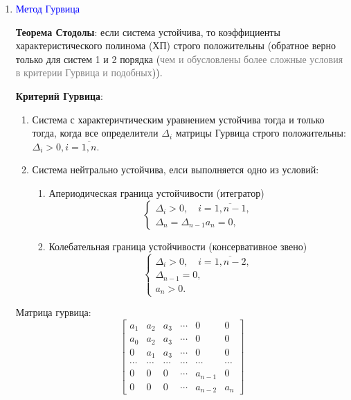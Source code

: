 \begin{enumerate}
    \item \textcolor{blue}{Метод Гурвица}
    
    \textbf{Теорема Стодолы}: если система устойчива, то коэффициенты характеристического полинома (ХП) строго положительны (обратное верно только для систем 1 и 2 порядка (\textcolor{gray}{чем и обусловлены более сложные условия в критерии Гурвица и подобных})).
    
    \textbf{Критерий Гурвица}:
    \begin{enumerate}
        \item Система с характеричтическим уравнением устойчива тогда и только тогда, когда все определители $\Delta_i$ матрицы Гурвица строго положительны: $\Delta_i > 0, i=\overline{1,n}$.
        \item Система нейтрально устойчива, елси выполняется одно из условий:
        \begin{enumerate}
            \item Апериодическая граница устойчивости (итегратор)
            \begin{equation}
                \begin{cases}
                    \Delta_i > 0, \quad i=\overline{1, n-1}, \\
                    \Delta_n = \Delta_{n-1} a_n = 0,
                \end{cases}
            \end{equation}
            \item Колебательная граница устойчивости (консервативное звено)
            \begin{equation}
                \begin{cases}
                    \Delta_i > 0, \quad i=\overline{1, n-2}, \\
                    \Delta_{n-1} = 0, \\
                    a_n > 0.
                \end{cases}
            \end{equation}
        \end{enumerate}
    \end{enumerate}
    
    Матрица гурвица:
    \begin{equation}
        \begin{bmatrix}
            a_1 & a_2 & a_3 &\cdots & 0 & 0 \\
            a_0 & a_2 & a_3 &\cdots & 0 & 0 \\
            0 & a_1 & a_3 &\cdots & 0 & 0 \\
            \cdots & \cdots & \cdots & \cdots & \cdots & \cdots \\
            0 & 0 & 0 &\cdots & a_{n-1} & 0 \\
            0 & 0 & 0 &\cdots & a_{n-2} & a_n
        \end{bmatrix}
    \end{equation}
    

\end{enumerate}
